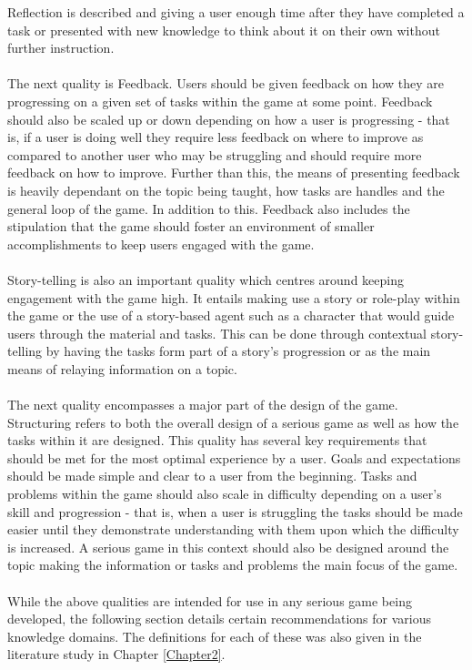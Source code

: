 \noindent Reflection is described and giving a user enough time after they have completed a task or presented with new knowledge to think about it on their own without further instruction.
\\\\
The next quality is Feedback. Users should be given feedback on how they are progressing on a given set of tasks within the game at some point. Feedback should also be scaled up or down depending on how a user is progressing - that is, if a user is doing well they require less feedback on where to improve as compared to another user who may be struggling and should require more feedback on how to improve. Further than this, the means of presenting feedback is heavily dependant on the topic being taught, how tasks are handles and the general loop of the game. In addition to this. Feedback also includes the stipulation that the game should foster an environment of smaller accomplishments to keep users engaged with the game.
\\\\
Story-telling is also an important quality which centres around keeping engagement with the game high. It entails making use a story or role-play within the game or the use of a story-based agent such as a character that would guide users through the material and tasks. This can be done through contextual story-telling by having the tasks form part of a story's progression or as the main means of relaying information on a topic.
\\\\
The next quality encompasses a major part of the design of the game. Structuring refers to both the overall design of a serious game as well as how the tasks within it are designed. This quality has several key requirements that should be met for the most optimal experience by a user. Goals and expectations should be made simple and clear to a user from the beginning. Tasks and problems within the game should also scale in difficulty depending on a user's skill and progression - that is, when a user is struggling the tasks should be made easier until they demonstrate understanding with them upon which the difficulty is increased. A serious game in this context should also be designed around the topic making the information or tasks and problems the main focus of the game.
\\\\
While the above qualities are intended for use in any serious game being developed, the following section details certain recommendations for various knowledge domains. The definitions for each of these was also given in the literature study in Chapter \ref{Chapter2}.

